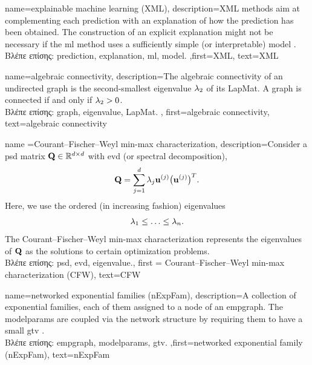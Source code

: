 {name={explainable machine learning (XML)}, 
	description={XML 
		methods aim at complementing each \gls{prediction} with an \gls{explanation} of 
		how the \gls{prediction} has been obtained. The construction of an explicit \gls{explanation} 
		might not be necessary if the \gls{ml} method uses a sufficiently simple (or interpretable) \gls{model} \cite{rudin2019stop}.\\
		\foreignlanguage{greek}{Βλέπε επίσης:} \gls{prediction}, \gls{explanation}, \gls{ml}, \gls{model}.
		},first={XML},
		text={XML} 
}

{name={algebraic connectivity},
	description={The algebraic connectivity of an undirected \gls{graph} 
		is the second-smallest \gls{eigenvalue} $\lambda_{2}$ of its \gls{LapMat}. A \gls{graph} is connected if and only if 
		$\lambda_{2} >0$.\\
		\foreignlanguage{greek}{Βλέπε επίσης:} \gls{graph}, \gls{eigenvalue}, \gls{LapMat}.
	},
	first={algebraic connectivity},
	text={algebraic connectivity}
}

{name ={Courant–Fischer–Weyl min-max characterization}, 
	description={Consider a \gls{psd} 
		matrix $\mathbf{Q} \in \mathbb{R}^{d \times d}$ with 
		\gls{evd} (or spectral decomposition), 
		$$ \mathbf{Q} = \sum_{j=1}^{d} \lambda_{j} {\bf u}^{(j)} \big(  {\bf u}^{(j)}  \big)^{T}.$$ 
		Here, we use the ordered (in increasing fashion) \gls{eigenvalue}s 
		\begin{equation}
			\nonumber
			 \lambda_{1}  \leq  \ldots \leq \lambda_{n}. 
		\end{equation}
		The Courant–Fischer–Weyl min-max characterization \cite[Th. 8.1.2]{GolubVanLoanBook} 
		represents the \gls{eigenvalue}s of $\mathbf{Q}$ as the solutions to certain optimization problems.\\
	\foreignlanguage{greek}{Βλέπε επίσης:} \gls{psd}, \gls{evd}, \gls{eigenvalue}.}, 
	first = {Courant–Fischer–Weyl min-max characterization (CFW)}, 
	text={CFW}
}

{name={networked exponential families (nExpFam)}, 
	description={A collection of exponential 
		families, each of them assigned to a node of an \gls{empgraph}. The \gls{modelparams} are coupled 
	   	via the network structure by requiring them to have a small \gls{gtv} \cite{JungNetExp2020}.\\
	   \foreignlanguage{greek}{Βλέπε επίσης:} \gls{empgraph}, \gls{modelparams}, \gls{gtv}.
	   },first={networked exponential family (nExpFam)},
	   text={nExpFam}  
}

